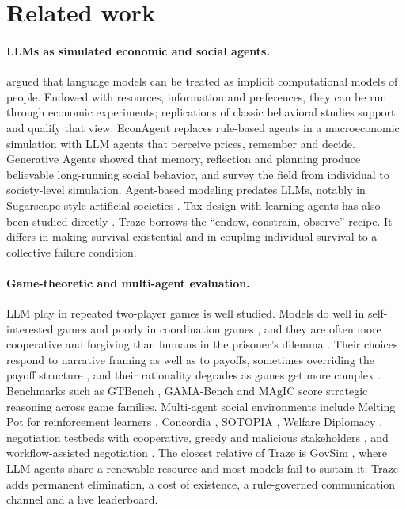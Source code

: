 \section{Related work}
\label{sec:related}

\paragraph{LLMs as simulated economic and social agents.}
\citet{horton2023homo} argued that language models can be treated as implicit computational models of people. Endowed with resources, information and preferences, they can be run through economic experiments; replications of classic behavioral studies \citep{aher2023using,argyle2023out,binz2023using} support and qualify that view.
EconAgent \citep{li2024econagent} replaces rule-based agents in a macroeconomic simulation with LLM agents that perceive prices, remember and decide.
Generative Agents \citep{park2023generative} showed that memory, reflection and planning produce believable long-running social behavior, and \citet{mou2024individual} survey the field from individual to society-level simulation.
Agent-based modeling predates LLMs, notably in Sugarscape-style artificial societies \citep{epstein1996growing}.
Tax design with learning agents has also been studied directly \citep{zheng2020ai}.
Traze borrows the ``endow, constrain, observe'' recipe. It differs in making survival existential and in coupling individual survival to a collective failure condition.

\paragraph{Game-theoretic and multi-agent evaluation.}
LLM play in repeated two-player games is well studied.
Models do well in self-interested games and poorly in coordination games \citep{akata2023playing}, and they are often more cooperative and forgiving than humans in the prisoner's dilemma \citep{fontana2024nicer}.
Their choices respond to narrative framing as well as to payoffs, sometimes overriding the payoff structure \citep{lore2024strategic}, and their rationality degrades as games get more complex \citep{fan2023can}.
Benchmarks such as GTBench \citep{duan2024gtbench}, GAMA-Bench \citep{huang2024far} and MAgIC \citep{xu2023magic} score strategic reasoning across game families.
Multi-agent social environments include Melting Pot for reinforcement learners \citep{leibo2021scalable}, Concordia \citep{vezhnevets2023generative}, SOTOPIA \citep{zhou2024sotopia}, Welfare Diplomacy \citep{mukobi2023welfare}, negotiation testbeds with cooperative, greedy and malicious stakeholders \citep{abdelnabi2023cooperation}, and workflow-assisted negotiation \citep{hua2024game}.
The closest relative of Traze is GovSim \citep{piatti2024cooperate}, where LLM agents share a renewable resource and most models fail to sustain it. Traze adds permanent elimination, a cost of existence, a rule-governed communication channel and a live leaderboard.


